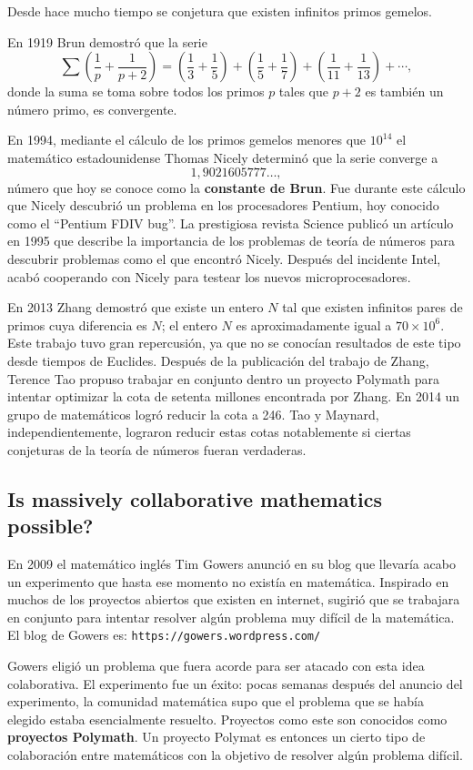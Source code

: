 Desde hace mucho tiempo se conjetura que existen infinitos primos gemelos. 

En 1919 Brun demostró que la serie
\[
	\sum\left(\frac1p+\frac1{p+2}\right)=\left(\frac13+\frac15\right)+\left(\frac15+\frac17\right)+\left(\frac1{11}+\frac1{13}\right)+\cdots,
\]
donde la suma se toma sobre todos los primos $p$ tales que $p+2$ es también un
número primo, es convergente. 

En 1994, mediante el cálculo de los primos
gemelos menores que $10^{14}$ el matemático estadounidense Thomas Nicely
determinó que la serie converge a 
\[
1,9021605777\dots,
\]
número que hoy se conoce
como la \textbf{constante de Brun}. Fue durante este cálculo que Nicely
descubrió un problema en los procesadores Pentium, hoy conocido como el
``Pentium FDIV bug''. La prestigiosa revista Science publicó un artículo en
1995 que describe la importancia de los problemas de teoría de números para
descubrir problemas como el que encontró Nicely.  Después del incidente Intel,
acabó cooperando con Nicely para testear los nuevos microprocesadores.

En 2013 Zhang demostró que existe un entero $N$ tal que existen infinitos pares
de primos cuya diferencia es $N$; el entero $N$ es aproximadamente igual a
$70\times10^6$.  Este trabajo tuvo gran repercusión, ya que no se conocían
resultados de este tipo desde tiempos de Euclides.  Después de la publicación
del trabajo de Zhang, Terence Tao propuso trabajar en conjunto dentro un
proyecto Polymath para intentar optimizar la cota de setenta millones
encontrada por Zhang. En 2014 un grupo de matemáticos logró reducir la cota a
246. Tao y Maynard, independientemente, lograron reducir estas cotas
notablemente si ciertas conjeturas de la teoría de números fueran verdaderas. 

\subsection*{Is massively collaborative mathematics possible?}

En 2009 el matemático inglés Tim Gowers anunció en su blog que llevaría acabo
un experimento que hasta ese momento no existía en matemática. Inspirado en
muchos de los proyectos abiertos que existen en internet, sugirió que se
trabajara en conjunto para intentar resolver algún problema muy difícil de la
matemática. El blog de Gowers es: \verb+https://gowers.wordpress.com/+ 

Gowers eligió un problema que fuera acorde para ser atacado con esta idea
colaborativa. El experimento fue un éxito: pocas semanas después del anuncio
del experimento, la comunidad matemática supo que el problema que se había
elegido estaba esencialmente resuelto. Proyectos como este son conocidos como
\textbf{proyectos Polymath}. Un proyecto Polymat es entonces un cierto tipo de
colaboración entre matemáticos con la objetivo de resolver algún problema
difícil. 

